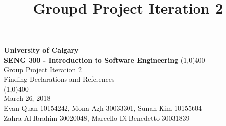 \documentclass[12p]{article}
\title{\vspace{-6ex}Groupd Project Iteration 2}
\date{\vspace{-12ex}}
\begin{document}
\thispagestyle{fancy}

\begin{titlepage}
  \begin{center}
    \vspace{1cm}
    \Large{\textbf{University of Calgary}}\\
    \Large{\textbf{SENG 300  - Introduction to Software Engineering}}
    \vfill
    \line(1,0){400}\\[1mm]
    \huge{Group Project Iteration 2}\\
    \large{Finding Declarations and References}\\
    \line(1,0){400}\\
    \Large March 26, 2018\\
    \vfill
    \large{Evan Quan 10154242, Mona Agh 30033301, Sunah Kim 10155604}\\
    \large{Zahra Al Ibrahim 30020048, Marcello Di Benedetto 30031839}\\
  \end{center}
\end{titlepage}

%
%
\end{document}
